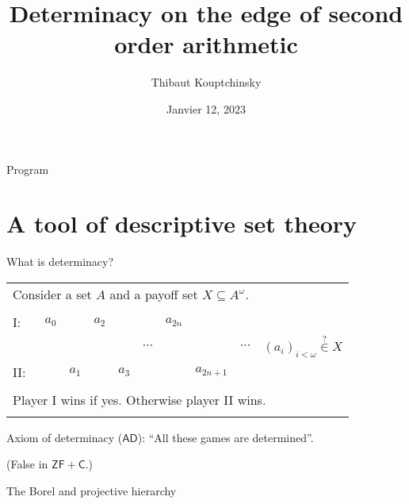 \documentclass{beamer} %
\title[Determinacy axioms]{Determinacy on the edge of second order arithmetic}
\institute[Logic Seminar]{Logic Seminar Tohoku University\and UCLouvain}
\author{Thibaut Kouptchinsky}
\date{Janvier 12, 2023}
\begin{document}
\begin{frame}
	\titlepage
\end{frame}


\begin{frame}{Program}
    \tableofcontents
\end{frame}

\section{A tool of descriptive set theory}

\begin{frame}{What is determinacy?}
    
    \begin{tabular}{llllllllll}
        \multicolumn{10}{l}{Consider a set $A$ and a payoff set $X \subseteq A^{\omega}$.}\\
        &&&&&&&&&\\
        I:\ & $a_0$ &       & $a_2$ &       &          &$a_{2n}$   &           & & \\
            &       &       &       &       & $\cdots$ &           &           & $\cdots$ & \qquad ${(a_i)}_{i < \omega} \overset{?}{\in} X$\\
        II:\ &       & $a_1$ &       & $a_3$ &          &           &$a_{2n+1}$ & & \\
        &&&&&&&&&\\
        \multicolumn{10}{l}{Player I wins if yes. Otherwise player II wins.} \\ 
        &&&&&&&&&\\
    \end{tabular}

    Axiom of determinacy ($\mathsf{AD}$): ``All these games are determined''.
    
    (False in $\mathsf{ZF + C}$.)
\end{frame}


\begin{frame}{The Borel and projective hierarchy}
    
\end{frame}

\end{document}
